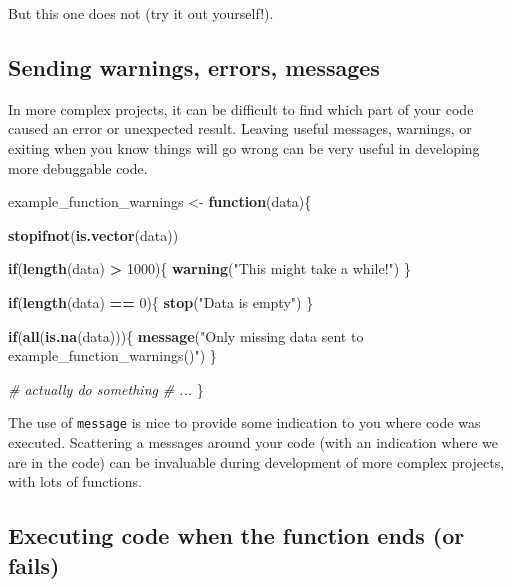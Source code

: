 \documentclass[]{book}
\newenvironment{Shaded}{\begin{snugshade}}{\end{snugshade}}
\newcommand{\CommentTok}[1]{\textcolor[rgb]{0.56,0.35,0.01}{\textit{#1}}}
\newcommand{\ControlFlowTok}[1]{\textcolor[rgb]{0.13,0.29,0.53}{\textbf{#1}}}
\newcommand{\DecValTok}[1]{\textcolor[rgb]{0.00,0.00,0.81}{#1}}
\newcommand{\KeywordTok}[1]{\textcolor[rgb]{0.13,0.29,0.53}{\textbf{#1}}}
\newcommand{\NormalTok}[1]{#1}
\newcommand{\OperatorTok}[1]{\textcolor[rgb]{0.81,0.36,0.00}{\textbf{#1}}}
\newcommand{\StringTok}[1]{\textcolor[rgb]{0.31,0.60,0.02}{#1}}
\begin{document}
But this one does not (try it out yourself!).

\hypertarget{sending-warnings-errors-messages}{%
\subsection{Sending warnings, errors, messages}\label{sending-warnings-errors-messages}}

In more complex projects, it can be difficult to find which part of your code caused an error or unexpected result. Leaving useful messages, warnings, or exiting when you know things will go wrong can be very useful in developing more debuggable code.

\begin{Shaded}
\begin{Highlighting}[]
\NormalTok{example_function_warnings <-}\StringTok{ }\ControlFlowTok{function}\NormalTok{(data)\{}
  
  \KeywordTok{stopifnot}\NormalTok{(}\KeywordTok{is.vector}\NormalTok{(data))}
  
  \ControlFlowTok{if}\NormalTok{(}\KeywordTok{length}\NormalTok{(data) }\OperatorTok{>}\StringTok{ }\DecValTok{1000}\NormalTok{)\{}
    \KeywordTok{warning}\NormalTok{(}\StringTok{"This might take a while!"}\NormalTok{)}
\NormalTok{  \}}
  
  \ControlFlowTok{if}\NormalTok{(}\KeywordTok{length}\NormalTok{(data) }\OperatorTok{==}\StringTok{ }\DecValTok{0}\NormalTok{)\{}
    \KeywordTok{stop}\NormalTok{(}\StringTok{"Data is empty"}\NormalTok{)}
\NormalTok{  \}}
  
  \ControlFlowTok{if}\NormalTok{(}\KeywordTok{all}\NormalTok{(}\KeywordTok{is.na}\NormalTok{(data)))\{}
    \KeywordTok{message}\NormalTok{(}\StringTok{"Only missing data sent to example_function_warnings()"}\NormalTok{)}
\NormalTok{  \}}
  
  \CommentTok{# actually do something}
  \CommentTok{# ...}
\NormalTok{\}}
\end{Highlighting}
\end{Shaded}

The use of \texttt{message} is nice to provide some indication to you where code was executed. Scattering a messages around your code (with an indication where we are in the code) can be invaluable during development of more complex projects, with lots of functions.

\hypertarget{executing-code-when-the-function-ends-or-fails}{%
\subsection{Executing code when the function ends (or fails)}\label{executing-code-when-the-function-ends-or-fails}}
\end{document}
